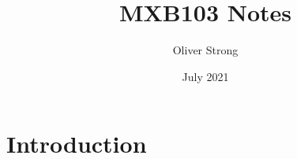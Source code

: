 \documentclass{article}
\title{MXB103 Notes}
\author{Oliver Strong}
\date{July 2021}
\begin{document}
\maketitle

\section{Introduction}
\end{document}
